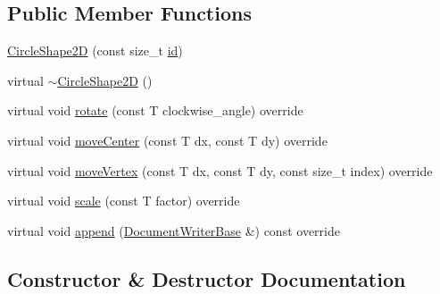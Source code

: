 \subsection*{Public Member Functions}
\begin{DoxyCompactItemize}
\item 
\hyperlink{classGraphicalEditorCore_1_1CircleShape2D_ac6e40c6596bafc87cb948f61225955e2}{Circle\+Shape2D} (const size\+\_\+t \hyperlink{classGraphicalEditorCore_1_1BaseShape2D_ac66cfa23289ae36d70ff6b7c41dd791f}{id})
\item 
virtual \hyperlink{classGraphicalEditorCore_1_1CircleShape2D_a8dac5c648f62af0e23fa50442d14407b}{$\sim$\+Circle\+Shape2D} ()
\item 
virtual void \hyperlink{classGraphicalEditorCore_1_1CircleShape2D_a587709b51a3b79c915c4939c65be178c}{rotate} (const T clockwise\+\_\+angle) override
\item 
virtual void \hyperlink{classGraphicalEditorCore_1_1CircleShape2D_a9bead68f8bd2224fe5e7a39d8e20f597}{move\+Center} (const T dx, const T dy) override
\item 
virtual void \hyperlink{classGraphicalEditorCore_1_1CircleShape2D_a833ad46ff3fd7e262238c332f50289e0}{move\+Vertex} (const T dx, const T dy, const size\+\_\+t index) override
\item 
virtual void \hyperlink{classGraphicalEditorCore_1_1CircleShape2D_aac68ae27380865c53a7a5e20b124725b}{scale} (const T factor) override
\item 
virtual void \hyperlink{classGraphicalEditorCore_1_1CircleShape2D_a56126680ab31d5b5de944b35e041855e}{append} (\hyperlink{classGraphicalEditorCore_1_1DocumentWriterBase}{Document\+Writer\+Base} \&) const override
\end{DoxyCompactItemize}


\subsection{Constructor \& Destructor Documentation}
